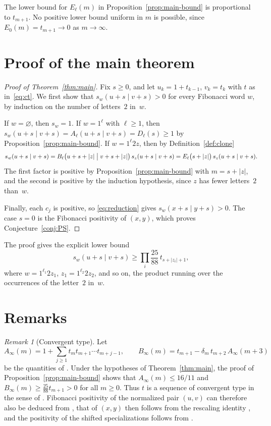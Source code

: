 \documentclass[11pt]{amsart}
\theoremstyle{definition}
\theoremstyle{remark}
\newtheorem{remark}[theorem]{Remark}
\numberwithin{equation}{section}
\begin{document}
The lower bound for $E_\ell(m)$ in Proposition~\ref{prop:main-bound} is proportional to $t_{m+1}$. No positive lower bound uniform in $m$ is possible, since $E_0(m)=t_{m+1}\to0$ as $m\to\infty$.

\section{Proof of the main theorem}\label{sec:proof}

\begin{proof}[Proof of Theorem~\ref{thm:main}]
Fix $s\ge0$, and let $u_k=1+t_{k-1}$, $v_k=t_k$ with $t$ as in~\eqref{eq:ct}. We first show that $s_w(u+s\mid v+s)>0$ for every Fibonacci word $w$, by induction on the number of letters~$2$ in~$w$.

If $w=\varnothing$, then $s_w=1$. If $w=1^\ell$ with $\ell\ge1$, then $s_w(u+s\mid v+s)=A_\ell(u+s\mid v+s)=D_\ell(s)\ge1$ by Proposition~\ref{prop:main-bound}. If $w=1^\ell2z$, then by Definition~\ref{def:clone}
\[
s_w(u+s\mid v+s)=B_\ell\bigl(u+s+|z|\bigm|v+s+|z|\bigr)\,s_z(u+s\mid v+s)=E_\ell\bigl(s+|z|\bigr)\,s_z(u+s\mid v+s).
\]
The first factor is positive by Proposition~\ref{prop:main-bound} with $m=s+|z|$, and the second is positive by the induction hypothesis, since $z$ has fewer letters~$2$ than~$w$.

Finally, each $c_j$ is positive, so \eqref{eq:reduction} gives $s_w(x+s\mid y+s)>0$. The case $s=0$ is the Fibonacci positivity of $(x,y)$, which proves Conjecture~\ref{conj:PS}.
\end{proof}

The proof gives the explicit lower bound
\[
s_w(u+s\mid v+s)\ge\prod_{i}\frac{25}{88}\,t_{s+|z_i|+1},
\]
where $w=1^{\ell_1}2z_1$, $z_1=1^{\ell_2}2z_2$, and so on, the product running over the occurrences of the letter~$2$ in~$w$.

\section{Remarks}\label{sec:remarks}

\begin{remark}[Convergent type]\label{rem:convergent}
Let
\[
A_\infty(m)=1+\sum_{j\ge1}t_mt_{m+1}\cdots t_{m+j-1},\qquad
B_\infty(m)=t_{m+1}-\delta_m\,t_{m+2}\,A_\infty(m+3)
\]
be the quantities of \cite[(4.4)]{PS26}. Under the hypotheses of Theorem~\ref{thm:main}, the proof of Proposition~\ref{prop:main-bound} shows that $A_\infty(m)\le16/11$ and $B_\infty(m)\ge\frac{25}{88}t_{m+1}>0$ for all $m\ge0$. Thus $t$ is a sequence of convergent type in the sense of \cite[Definition~4.6]{PS26}. Fibonacci positivity of the normalized pair $(u,v)$ can therefore also be deduced from \cite[Proposition~4.7]{PS26}, that of $(x,y)$ then follows from the rescaling identity \cite[(2.13)]{PS26}, and the positivity of the shifted specializations follows from \cite[Proposition~5.8]{PS26}.
\end{remark}
\end{document}
